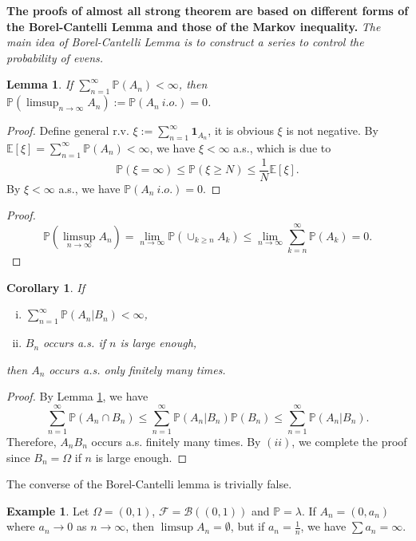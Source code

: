 \documentclass[11pt]{article}
\newtheorem{lemma}[theorem]{Lemma}
\newtheorem{corollary}[theorem]{Corollary}
\theoremstyle{definition}
\newtheorem{example}[theorem]{Example}
\begin{document}
{\bf The proofs of almost all strong theorem are based on different forms of the Borel-Cantelli Lemma and those of the Markov inequality.} {\em The main idea of Borel-Cantelli Lemma is to construct a series to control the probability of evens.}
\begin{lemma}\label{1}
  If $\sum_{n=1}^\infty \mathbb{P}(A_n)<\infty$, then $\mathbb{P}(\limsup_{n\rightarrow \infty} A_n):=\mathbb{P}(A_n\ i.o.)=0$.
\end{lemma}
\begin{proof}
  Define general r.v. $\xi:=\sum^\infty_{n=1} \mathbf{1}_{A_n}$, it is obvious $\xi$ is not negative. By $\mathbb{E}[\xi]=\sum^\infty_{n=1}\mathbb{P}(A_n)<\infty$, we have $\xi<\infty$ a.s., which is due to 
\[
\mathbb{P}(\xi=\infty)\le \mathbb{P}(\xi\ge N)\le \frac{1}{N}\mathbb{E}[\xi].
\]
By $\xi<\infty$ a.s., we have $\mathbb{P}(A_n\ i.o.)=0$.
\end{proof}
\begin{proof}
\[
  \mathbb{P}(\limsup_{n\rightarrow \infty} A_n)=\lim_{n\rightarrow \infty}\mathbb{P}(\cup_{k\ge n} A_k)\le \lim_{n\rightarrow \infty} \sum^\infty_{k=n} \mathbb{P}(A_k)=0.
\]
\end{proof}
\begin{corollary} If
  \begin{enumerate}[(i)]
    \item $\sum_{n=1}^\infty \mathbb{P}({A_n}|B_n)<\infty$,
    \item $B_n$ occurs a.s. if $n$ is large enough,
  \end{enumerate}
then ${A}_n$ occurs a.s. only finitely many times.
\end{corollary}
\begin{proof}
  By Lemma \ref{1}, we have 
\[
\sum^\infty_{n=1}\mathbb{P}(A_n\cap B_n)\le \sum^\infty_{n=1}\mathbb{P}(A_n| B_n)\mathbb{P}(B_n)\le \sum^\infty_{n=1}\mathbb{P}(A_n| B_n).
\]
Therefore, $A_nB_n$ occurs a.s. finitely many times. By $(ii)$, we complete the proof since $B_n=\Omega$ if $n$ is large enough.
\end{proof}

The converse of the Borel-Cantelli lemma is trivially false.
\begin{example}
  Let $\Omega=(0,1)$, $\mathcal{F}=\mathscr{B}({(0,1)})$ and $\mathbb{P}=\lambda$. If $A_n=(0,a_n)$ where $a_n\rightarrow 0$ as $n\rightarrow \infty$, then $\limsup A_n=\emptyset$, but if $a_n=\frac{1}{n}$, we have $\sum a_n=\infty$.
\end{example}
\end{document}
